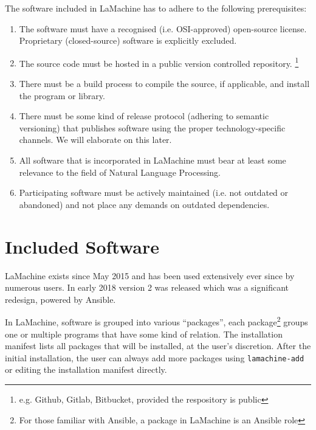\documentclass[a4paper,11pt]{article}
\begin{document}
The software included in LaMachine has to adhere to the following prerequisites:

\begin{enumerate}

    \item The software must have a recognised (i.e. OSI-approved) open-source license.
        Proprietary (closed-source) software is explicitly excluded.
    \item The source
        code must be hosted in a public version controlled repository. \footnote{e.g. Github, Gitlab, Bitbucket, provided
        the respository is public}
    \item There must be a build process to compile the source, if applicable, and install the program or library.
    \item There must be some kind of release protocol (adhering to semantic versioning) that publishes software using the proper
technology-specific channels. We will elaborate on this later.
    \item All software that is incorporated in LaMachine must bear at least some relevance to the field of Natural Language Processing.
    \item Participating software must be actively maintained (i.e. not outdated or abandoned) and not place any demands on outdated
        dependencies. %
\end{enumerate}


\section{ Included Software}

LaMachine exists since May 2015 and has been used extensively ever since by numerous users. In early 2018 version 2 was
released which was a significant redesign, powered by Ansible.

In LaMachine, software is grouped into various ``packages'', each package\footnote{For those familiar with
Ansible, a package in LaMachine is an Ansible role} groups one or multiple programs that have some kind of relation. The
installation manifest lists all packages that will be installed, at the user's discretion. After the initial
installation, the user can always add more packages using \texttt{lamachine-add} or editing the installation manifest directly.
\end{document}
